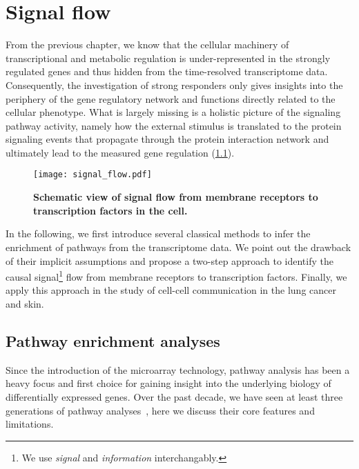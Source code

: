 \chapter{Signal flow}
From the previous chapter, we know that the cellular machinery of 
transcriptional and metabolic regulation is under-represented in the strongly 
regulated genes and thus hidden from the time-resolved transcriptome data. 
Consequently, the investigation of strong responders only gives insights into
the periphery of the gene regulatory network and functions directly related
to the cellular phenotype. What is largely missing is a holistic picture of
the signaling pathway activity, namely how the external stimulus is translated
to the protein signaling events that propagate through the protein interaction
network and ultimately lead to the measured gene regulation (\ref{fig:signal_flow}).

\begin{figure}[!ht]
\begin{center}
\texttt{[image: signal\_flow.pdf]}
\end{center}
\caption[Signal flow]{{\bf Schematic view of signal flow from membrane 
receptors to transcription factors in the cell.}
}
\label{fig:signal_flow}
\end{figure}

In the following, we first introduce several classical methods to infer the
enrichment of pathways from the transcriptome data. We point out the drawback
of their implicit assumptions and propose a two-step approach to identify the
causal signal\footnote{We use \emph{signal} and \emph{information} interchangably.} 
flow from membrane receptors to transcription factors. Finally,
we apply this approach in the study of cell-cell communication in the lung
cancer and skin.

\section{Pathway enrichment analyses}
Since the introduction of the microarray technology, pathway analysis has been 
a heavy focus and first choice for gaining insight into the underlying biology 
of differentially expressed genes. Over the past decade, we have seen at least 
three generations of pathway analyses~\citep{Khatri2012}, here we discuss 
their core features and limitations.

